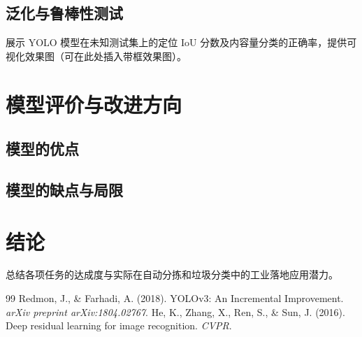 \documentclass[12pt,a4paper]{ctexart}
\begin{document}
\subsection{泛化与鲁棒性测试}
展示 YOLO 模型在未知测试集上的定位 IoU 分数及内容量分类的正确率，提供可视化效果图（可在此处插入带框效果图）。

\section{模型评价与改进方向}
\subsection{模型的优点}
\subsection{模型的缺点与局限}

\section{结论}
总结各项任务的达成度与实际在自动分拣和垃圾分类中的工业落地应用潜力。

\begin{thebibliography}{99}
 Redmon, J., \& Farhadi, A. (2018). YOLOv3: An Incremental Improvement. \textit{arXiv preprint arXiv:1804.02767}.
 He, K., Zhang, X., Ren, S., \& Sun, J. (2016). Deep residual learning for image recognition. \textit{CVPR}.
\end{thebibliography}
\end{document}
